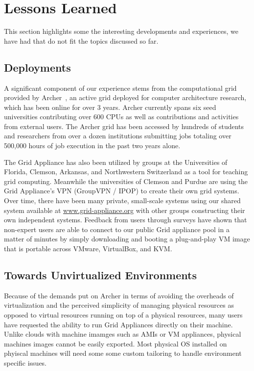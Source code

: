 \documentclass[twocolumn]{svjour3}
\begin{document}
\section{Lessons Learned}
\label{lessons_learned}

This section highlights some the interesting developments and experiences, we
have had that do not fit the topics discussed so far.  

\subsection{Deployments}

A significant component of our experience stems from the computational grid
provided by Archer~\cite{archer}, an active grid deployed for computer
architecture research, which has been online for over 3 years.  Archer
currently spans six seed universities contributing over 600 CPUs as well as
contributions and activities from external users.  The Archer grid has been
accessed by hundreds of students and researchers from over a dozen institutions
submitting jobs totaling over 500,000 hours of job execution in the past two
years alone.

The Grid Appliance has also been utilized by groups at the Universities of
Florida, Clemson, Arkansas, and Northwestern Switzerland as a tool for teaching
grid computing.  Meanwhile the universities of Clemson and Purdue are using the
Grid Appliance's VPN (GroupVPN / IPOP) to create their own grid systems.  Over
time, there have been many private, small-scale systems using our shared system
available at \url{www.grid-appliance.org} with other groups constructing their
own independent systems.  Feedback from users through surveys have shown that
non-expert users are able to connect to our public Grid appliance pool in a
matter of minutes by simply downloading and booting a plug-and-play VM image
that is portable across VMware, VirtualBox, and KVM.

\subsection{Towards Unvirtualized Environments}
\label{packaging}

Because of the demands put on Archer in terms of avoiding the overheads of
virtualization and the perceived simplicity of managing physical resources as
opposed to virtual resources running on top of a physical resources, many users
have requested the ability to run Grid Appliances directly on their machine.
Unlike clouds with machine imamges such as AMIs or VM appliances, physical
machines images cannot be easily exported.  Most physical OS installed on
phyiscal machines will need some some custom tailoring to handle environment
specific issues.
\end{document}
